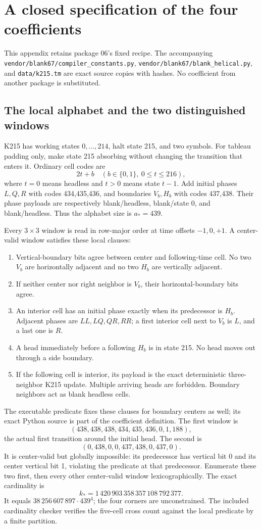 \documentclass[11pt,a4paper]{article}
\theoremstyle{remark}\newtheorem{remark}[theorem]{Remark}
\newcommand{\src}[1]{\nolinkurl{#1}}
\begin{document}
\appendix
\section{A closed specification of the four coefficients}\label{app:coefficients}
This appendix retains package 06's fixed recipe. The accompanying
\src{vendor/blank67/compiler_constants.py},
\src{vendor/blank67/blank_helical.py}, and \src{data/k215.tm}
are exact source copies with hashes. No coefficient from another
package is substituted.

\subsection{The local alphabet and the two distinguished windows}
K215 has working states $0,\ldots,214$, halt state 215, and two symbols.
For tableau padding only, make state 215 absorbing without changing
the transition that enters it. Ordinary cell codes are
\[
 2t+b\quad(b\in\{0,1\},\ 0\le t\le216),
\]
where $t=0$ means headless and $t>0$ means state $t-1$.
Add initial phases $L,Q,R$ with codes 434,435,436, and boundaries
$V_b,H_b$ with codes 437,438. Their phase payloads are respectively
blank/headless, blank/state 0, and blank/headless.
Thus the alphabet size is $a_*=439$.

Every $3\times3$ window is read in row-major order at time offsets
$-1,0,+1$. A center-valid window satisfies these local clauses:
\begin{enumerate}
\item Vertical-boundary bits agree between center and following-time
cell. No two $V_b$ are horizontally adjacent and no two $H_b$ are
vertically adjacent.
\item If neither center nor right neighbor is $V_b$,
their horizontal-boundary bits agree.
\item An interior cell has an initial phase exactly when its predecessor
is $H_b$. Adjacent phases are $LL,LQ,QR,RR$; a first interior cell
next to $V_b$ is $L$, and a last one is $R$.
\item A head immediately before a following $H_b$ is in state 215.
No head moves out through a side boundary.
\item If the following cell is interior, its payload is the exact
deterministic three-neighbor K215 update. Multiple arriving heads are
forbidden. Boundary neighbors act as blank headless cells.
\end{enumerate}
The executable predicate fixes these clauses for boundary centers as
well; its exact Python source is part of the coefficient definition.
The first window is
\[
 (438,438,438,434,435,436,0,1,188),
\]
the actual first transition around the initial head. The second is
\[
 (0,438,0,0,437,438,0,437,0).
\]
It is center-valid but globally impossible: its predecessor has
vertical bit 0 and its center vertical bit 1, violating the predicate
at that predecessor. Enumerate these two first, then every other
center-valid window lexicographically. The exact cardinality is
\[
 k_*=1\,420\,903\,358\,357\,108\,792\,377.
\]
It equals $38\,256\,607\,897\cdot439^4$; the four corners are
unconstrained. The included cardinality checker verifies the five-cell
cross count against the local predicate by a finite partition.
\end{document}
